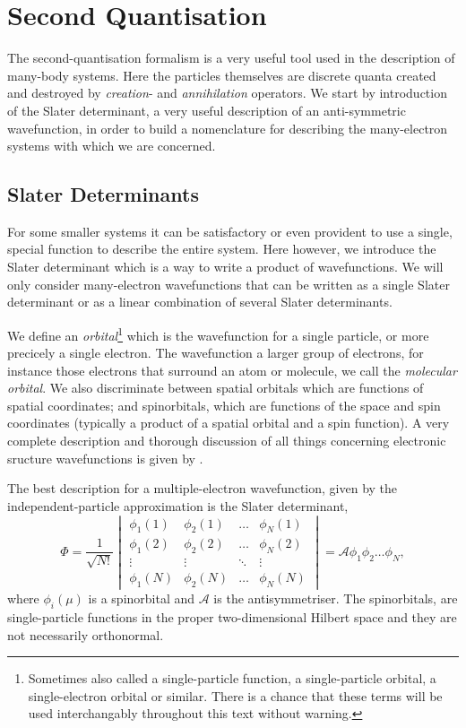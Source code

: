 \chapter{Second Quantisation}
 
The second-quantisation formalism is a very useful tool used in the description of 
many-body systems. Here the particles themselves are discrete quanta created and 
destroyed by \emph{creation}- and \emph{annihilation} operators. We start by introduction 
of the Slater determinant, a very useful description of an anti-symmetric wavefunction,
in order to build a nomenclature for describing the many-electron systems with 
which we are concerned.

\section{Slater Determinants}

For some smaller
systems it can be satisfactory or even provident to use a single, special function 
to describe the entire system. Here however, we introduce the Slater determinant which 
is a way to write a product of wavefunctions.  
We will only consider many-electron wavefunctions that can be written as a single 
Slater determinant or as a linear combination of several Slater determinants.

We define an \emph{orbital}\footnote{Sometimes also called a single-particle function,
a single-particle orbital, a single-electron orbital or similar. There is a chance that 
these terms will be used interchangably throughout this text without warning.} which is the
wavefunction for a single particle, or more precicely a single electron. The wavefunction
a larger group of electrons, for instance those electrons that surround an atom or molecule,
we call the \emph{molecular orbital}. We also discriminate between 
spatial orbitals which are functions of spatial coordinates; and spinorbitals, which 
are functions of the space and spin coordinates (typically a product of a spatial orbital
and a spin function). A very complete description and thorough discussion of all things 
concerning electronic sructure wavefunctions is given 
by \citeauthor{szabo2012modern}\cite{szabo2012modern}.

The best description for a multiple-electron wavefunction, given by the independent-particle
approximation is the Slater determinant,
\begin{equation}
    \label{eq:general_slater_determinant}
    \Phi = \frac{1}{\sqrt{N!}} \begin{vmatrix}
        \phi_1(1) & \phi_2(1) & \dots & \phi_N(1) \\
        \phi_1(2) & \phi_2(2) & \dots & \phi_N(2) \\
        \vdots & \vdots & \ddots & \vdots \\
        \phi_1(N) & \phi_2(N) & \dots & \phi_N(N)
    \end{vmatrix}
    = \mathcal{A}\phi_1 \phi_2 \dots \phi_N,
\end{equation}
where $\phi_i(\mu)$ is a spinorbital and $\mathcal{A}$ is the antisymmetriser. The
spinorbitals, are single-particle functions in the proper two-dimensional 
Hilbert space and they are not necessarily orthonormal.

